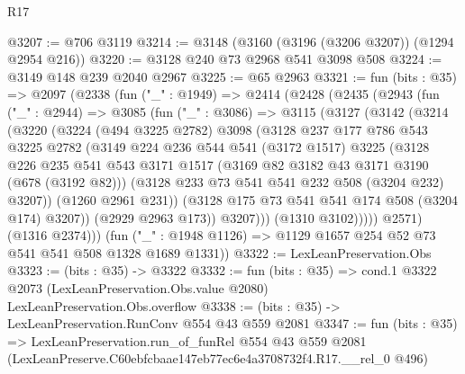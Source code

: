 \begin{lexlean}{R17}
\begin{coremodule}
@3207 := @706 @3119
@3214 := @3148 (@3160 (@3196 (@3206 @3207)) (@1294 @2954 @216))
@3220 := @3128 @240 @73 @2968 @541 @3098 @508
@3224 := @3149 @148 @239 @2040 @2967
@3225 := @65 @2963
@3321 := fun (bits : @35) =>
  @2097
    (@2338
      (fun ("_" : @1949) =>
      @2414
        (@2428
          (@2435
            (@2943
              (fun ("_" : @2944) =>
              @3085
                (fun ("_" : @3086) =>
                @3115
                  (@3127
                    (@3142
                      (@3214
                        (@3220
                          (@3224
                            (@494 @3225 @2782)
                            @3098
                            (@3128
                              @237
                              @177
                              @786
                              @543
                              @3225
                              @2782
                              (@3149
                                @224
                                @236
                                @544
                                @541
                                (@3172 @1517)
                                @3225
                                (@3128
                                  @226
                                  @235
                                  @541
                                  @543
                                  @3171
                                  @1517
                                  (@3169 @82 @3182 @43 @3171 @3190 (@678 (@3192 @82)))
                                  (@3128 @233 @73 @541 @541 @232 @508 (@3204 @232) @3207))
                                (@1260 @2961 @231))
                              (@3128 @175 @73 @541 @541 @174 @508 (@3204 @174) @3207))
                            (@2929 @2963 @173))
                          @3207)))
                    (@1310 @3102)))))
            @2571)
          (@1316 @2374)))
      (fun ("_" : @1948 @1126) => @1129 @1657 @254 @52 @73 @541 @541 @508 @1328 @1689 @1331))
@3322 := LexLeanPreservation.Obs
@3323 := (bits : @35) -> @3322
@3332 := fun (bits : @35) =>
  cond.{1} @3322 @2073 (LexLeanPreservation.Obs.value @2080) LexLeanPreservation.Obs.overflow
@3338 := (bits : @35) -> LexLeanPreservation.RunConv @554 @43 @559 @2081
@3347 := fun (bits : @35) =>
  LexLeanPreservation.run_of_funRel
    @554
    @43
    @559
    @2081
    (LexLeanPreserve.C60ebfcbaae147eb77ec6e4a3708732f4.R17.__rel_0 @496)
\end{coremodule}
\end{lexlean}
